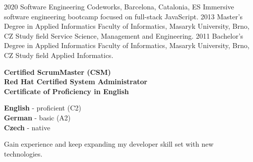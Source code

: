 \documentclass[9pt]{developercv}
\begin{document}

\begin{entrylist}
  \entry
  {2020}
  {Software Engineering}
  {Codeworks, Barcelona, Catalonia, ES}
  {Immersive software engineering bootcamp focused on full-stack JavaScript.}
  \entry
  {2013}
  {Master's Degree in Applied Informatics}
  {Faculty of Informatics, Masaryk University, Brno, CZ}
  {Study field Service Science, Management and Engineering.}
  \entry
  {2011}
  {Bachelor's Degree  in Applied Informatics}
  {Faculty of Informatics, Masaryk University, Brno, CZ}
  {Study field Applied Informatics.}
\end{entrylist}

\begin{minipage}[t]{0.35\textwidth}
  \vspace{-\baselineskip}


  \textbf{Certified ScrumMaster (CSM)}\\
  \textbf{Red Hat Certified System Administrator}\\
  \textbf{Certificate of Proficiency in English}
\end{minipage}
\hfill
\begin{minipage}[t]{0.2\textwidth}
  \vspace{-\baselineskip}


  \textbf{English} - proficient (C2)\\
  \textbf{German} - basic (A2)\\
  \textbf{Czech} - native
\end{minipage}
\hfill
\begin{minipage}[t]{0.27\textwidth}
  \vspace{-\baselineskip}


  Gain experience and keep expanding my developer skill set with new technologies.
\end{minipage}
\end{document}
